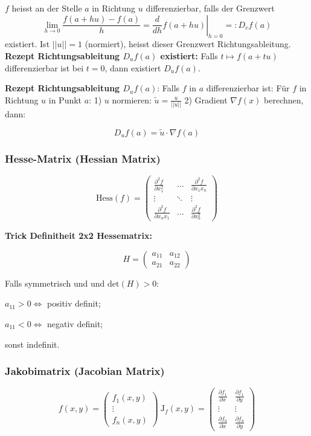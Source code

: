 $f$ heisst an der Stelle $a$ in Richtung $u$ differenzierbar, falls der Grenzwert 
	\[
		\lim_{h\to0}\frac{f(a + hu) -f(a)}{h} =
		\left.\frac{d}{dh}f(a+hu)\right|_{h = 0}
		=: D_vf(a)
	\]
existiert. Ist $||u|| = 1$ (normiert), heisst dieser Grenzwert Richtungsableitung.\\

\textbf{Rezept Richtungsableitung $D_uf(a)$ existiert:} Falls $t \mapsto f(a + tu)$ differenzierbar ist bei $t=0$, dann existiert $D_uf(a)$.

\textbf{Rezept Richtungsableitung $D_u f(a)$}: Falls $f$ in $a$ differenzierbar ist: Für $f$ in Richtung $u$ in Punkt $a$: 1) $u$ normieren: $\tilde{u} = \frac{u}{||u||}$ 2) Gradient $\nabla f(x)$ berechnen, dann:

\[
    D_u f(a) = \tilde{u} \cdot \nabla f(a)
\]
	
\subsubsection{Hesse-Matrix (Hessian Matrix)}    

\[
    \text{Hess}(f) =
        \begin{pmatrix}
            \frac{\partial^2 f}{\partial x_1^2}&\hdots&\frac{\partial^2 f}{\partial x_1 x_n}\\
            \vdots&\ddots&\vdots\\
            \frac{\partial^2 f}{\partial x_n x_1}&\hdots&\frac{\partial^2 f}{\partial x_n^2}
        \end{pmatrix}
\]

\textbf{Trick Definitheit 2x2 Hessematrix:}

\[
    H =
        \begin{pmatrix}
            a_{11} & a_{12}\\
            a_{21} & a_{22}
        \end{pmatrix}
\]

Falls symmetrisch und und $\text{det}(H) > 0$:

$a_{11} > 0 \iff$ positiv definit;

$a_{11} < 0 \iff$ negativ definit;

sonst indefinit.


\subsubsection{Jakobimatrix (Jacobian Matrix)}

\[
    f(x, y) =
        \begin{pmatrix}
            f_1(x, y)\\
            \vdots\\
            f_n(x, y)
        \end{pmatrix}\ 
    \text{J}_f(x, y) =
        \begin{pmatrix}
                \frac{\partial f_1}{\partial x} & \frac{\partial f_1}{\partial y}\\
                \vdots&\vdots\\
            \frac{\partial f_n}{\partial x} & \frac{\partial f_n}{\partial y}
        \end{pmatrix}
\]

